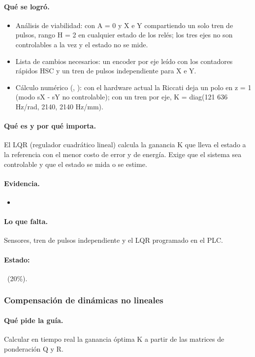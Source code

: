 \documentclass[a4paper,11pt]{article}
\begin{document}
\paragraph{Qué se logró.}
\begin{itemize}
\item Análisis de viabilidad: con A = 0 y X e Y compartiendo un solo tren de pulsos, rango H = 2 en cualquier estado de los relés; los tres ejes no son controlables a la vez y el estado no se mide.
\item Lista de cambios necesarios: un encoder por eje leído con los contadores rápidos HSC y un tren de pulsos independiente para X e Y.
\item Cálculo numérico (, ): con el hardware actual la Riccati deja un polo en z = 1 (modo sX - sY no controlable); con un tren por eje, K = diag(121 636 Hz/rad, 2140, 2140 Hz/mm).
\end{itemize}
\paragraph{Qué es y por qué importa.} El LQR (regulador cuadrático lineal) calcula la ganancia K que lleva el estado a la referencia con el menor costo de error y de energía. Exige que el sistema sea controlable y que el estado se mida o se estime.
\paragraph{Evidencia.}
\begin{itemize}\small
\item {}
\end{itemize}
\paragraph{Lo que falta.} Sensores, tren de pulsos independiente y el LQR programado en el PLC.
\paragraph{Estado:} \parcial~(20\%).
\subsubsection{Compensación de dinámicas no lineales}
\paragraph{Qué pide la guía.} Calcular en tiempo real la ganancia óptima K a partir de las matrices de ponderación Q y R.
\end{document}
